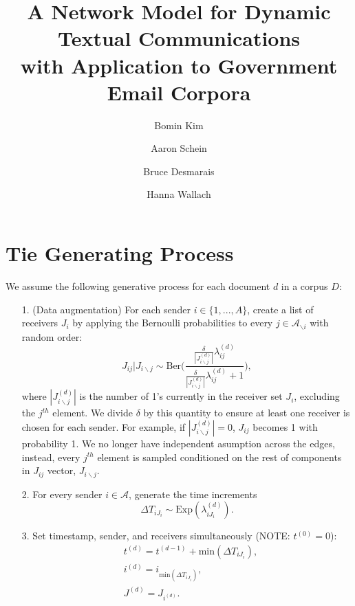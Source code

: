 \documentclass[a4paper]{article}
\title{A Network Model for Dynamic Textual Communications \\with Application to
	Government Email Corpora}
\author[1]{Bomin Kim}
\author[3]{Aaron Schein}
\author[1]{Bruce Desmarais}
\author[2,3]{Hanna Wallach}
\affil[1]{Pennsylvania State University}
\affil[2]{Microsoft Research NYC}
\affil[3]{University of Massachusetts Amherst}
\begin{document}
\maketitle
\section{Tie Generating Process}\label{subsec: Tie Generating Process}
We assume the following generative process for each document $d$ in a corpus $D$:
\begin{itemize}
	\item[1.] (Data augmentation) For each sender $i \in \{1,...,A\}$, create a list of receivers $J_i$ by applying the Bernoulli probabilities to every $j \in \mathcal{A}_{\backslash i}$ with random order:
	\begin{equation}J_{ij}|J_{i\backslash j} \sim \mbox{Ber}\Big(\frac{\frac{\delta}{|J^{(d)}_{i \backslash j}|}\lambda^{(d)}_{ij}}{\frac{\delta}{|J^{(d)}_{i\backslash j}|}\lambda^{(d)}_{ij}+1}\Big),
	\end{equation}
	where $|J^{(d)}_{i\backslash j}|$ is the number of 1's currently in the receiver set $J_i$, excluding the $j^{th}$ element. We divide $\delta$ by this quantity to ensure at least one receiver is chosen for each sender. For example, if $|J^{(d)}_{i\backslash j}| = 0$, $J_{ij}$ becomes 1 with probability 1. We no longer have independent asumption across the edges, instead, every $j^{th}$ element is sampled conditioned on the rest of components in $J_{ij}$ vector, $ J_{i\backslash j}$.
	\item[2.] For every sender $i \in \mathcal{A}$, generate the time increments \begin{equation}
	\Delta T_{i{J_i}} \sim \mbox{Exp}(\lambda_{i{J_i}}^{(d)}).
	\end{equation}
	\item[3.] Set timestamp, sender, and receivers simultaneously (NOTE: $t^{(0)}=0$):
	\begin{equation}
	\begin{aligned}
	&t^{(d)} = t^{(d-1)}+\mbox{min}(\Delta T_{i{J_i}}),\\
	&i^{(d)} = i_{\mbox{min}(\Delta T_{i{J_i}})}, \\
	&J^{(d)} = J_{i^{(d)}}.
	\end{aligned}
	\end{equation}
\end{itemize}
\end{document}
